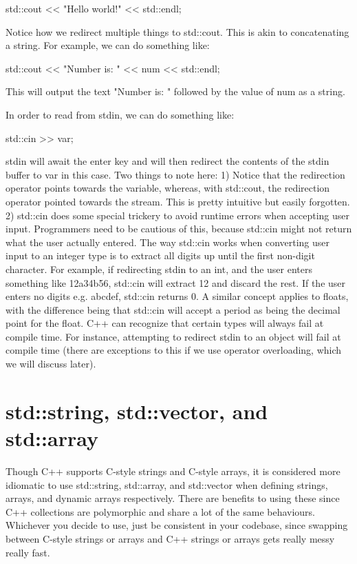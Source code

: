 \documentclass{article}
\begin{document}
\begin{cpplst}
std::cout << "Hello world!" << std::endl;
\end{cpplst}

Notice how we redirect multiple things to std::cout. This is akin to concatenating a string. For example, we
can do something like:

\begin{cpplst}
std::cout << "Number is: " << num << std::endl;
\end{cpplst}

This will output the text "Number is: " followed by the value of num as a string.

In order to read from stdin, we can do something like:

\begin{cpplst}
std::cin >> var;
\end{cpplst}

stdin will await the enter key and will then redirect the contents of the stdin buffer to var in this case.
Two things to note here: 1) Notice that the redirection operator points towards the variable, whereas, with
std::cout, the redirection operator pointed towards the stream. This is pretty intuitive but easily forgotten.
2) std::cin does some special trickery to avoid runtime errors when accepting user input. Programmers need to
be cautious of this, because std::cin might not return what the user actually entered. The way std::cin works
when converting user input to an integer type is to extract all digits up until the first non-digit character.
For example, if redirecting stdin to an int, and the user enters something like 12a34b56, std::cin will
extract 12 and discard the rest. If the user enters no digits e.g. abcdef, std::cin returns 0. A similar
concept applies to floats, with the difference being that std::cin will accept a period as being the decimal
point for the float. C++ can recognize that certain types will always fail at compile time. For instance,
attempting to redirect stdin to an object will fail at compile time (there are exceptions to this if we use
operator overloading, which we will discuss later).

\section{std::string, std::vector, and std::array}

Though C++ supports C-style strings and C-style arrays, it is considered more idiomatic to use std::string,
std::array, and std::vector when defining strings, arrays, and dynamic arrays respectively. There are benefits
to using these since C++ collections are polymorphic and share a lot of the same behaviours. Whichever you
decide to use, just be consistent in your codebase, since swapping between C-style strings or arrays and C++
strings or arrays gets really messy really fast.
\end{document}
